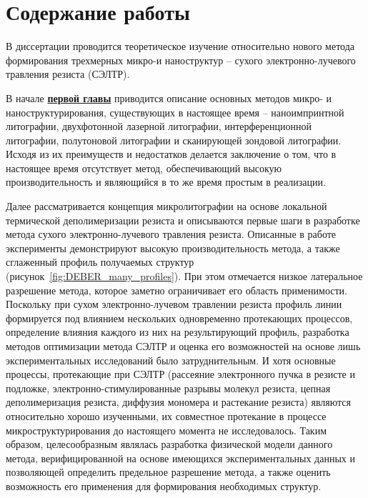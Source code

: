 \chapter*{Содержание работы}
В диссертации проводится теоретическое изучение относительно нового метода формирования трехмерных микро-и наноструктур -- сухого электронно-лучевого травления резиста (СЭЛТР). 

В начале \underline{\textbf{первой главы}} приводится описание основных методов микро- и наноструктурирования, существующих в настоящее время -- наноимпринтной литографии, двухфотонной лазерной литографии, интерференционной литографии, полутоновой литографии и сканирующей зондовой литографии. Исходя из их преимуществ и недостатков делается заключение о том, что в настоящее время отсутствует метод, обеспечивающий высокую производительность и являющийся в то же время простым в реализации.

Далее рассматривается концепция микролитографии на основе локальной термической деполимеризации резиста и описываются первые шаги в разработке метода сухого электронно-лучевого травления резиста. Описанные в работе~\cite{Bruk_2016_mee} эксперименты демонстрируют высокую производительность метода, а также сглаженный профиль получаемых структур (рисунок~\ref{fig:DEBER_many_profiles}). При этом отмечается низкое латеральное разрешение метода, которое заметно ограничивает его область применимости. Поскольку при сухом электронно-лучевом травлении резиста профиль линии формируется под влиянием нескольких одновременно протекающих процессов, определение влияния каждого из них на результирующий профиль, разработка методов оптимизации метода СЭЛТР и оценка его возможностей на основе лишь экспериментальных исследований было затруднительным. И хотя основные процессы, протекающие при СЭЛТР (рассеяние электронного пучка в резисте и подложке, электронно-стимулированные разрывы молекул резиста, цепная деполимеризация резиста, диффузия мономера и растекание резиста) являются относительно хорошо изученными, их совместное протекание в процессе микроструктурирования до настоящего момента не исследовалось. Таким образом, целесообразным являлась разработка физической модели данного метода, верифицированной на основе имеющихся экспериментальных данных и позволяющей определить предельное разрешение метода, а также оценить возможность его применения для формирования необходимых структур.


